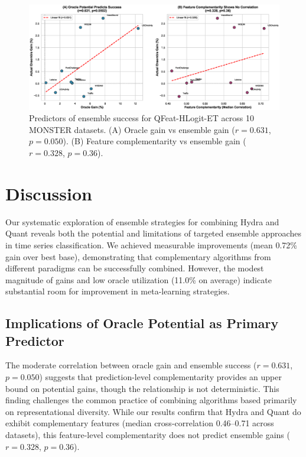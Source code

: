 \documentclass[pdflatex,sn-basic]{sn-jnl}           %
\theoremstyle{thmstyleone}%
\theoremstyle{thmstyletwo}%
\theoremstyle{thmstylethree}%
\begin{document}
\begin{figure}[tb]
\centering
\includegraphics[width=\textwidth]{figure3_predictors}
\caption{Predictors of ensemble success for QFeat-HLogit-ET across 10 MONSTER datasets. (A) Oracle gain vs ensemble gain ($r=0.631$, $p=0.050$). (B) Feature complementarity vs ensemble gain ($r=0.328$, $p=0.36$).}\label{fig:predictors}
\end{figure}


\section{Discussion}\label{sec6}

Our systematic exploration of ensemble strategies for combining Hydra and Quant reveals both the potential and limitations of targeted ensemble approaches in time series classification. We achieved measurable improvements (mean 0.72\% gain over best base), demonstrating that complementary algorithms from different paradigms can be successfully combined. However, the modest magnitude of gains and low oracle utilization (11.0\% on average) indicate substantial room for improvement in meta-learning strategies.

\subsection{Implications of Oracle Potential as Primary Predictor}

The moderate correlation between oracle gain and ensemble success ($r=0.631$, $p=0.050$) suggests that prediction-level complementarity provides an upper bound on potential gains, though the relationship is not deterministic. This finding challenges the common practice of combining algorithms based primarily on representational diversity. While our results confirm that Hydra and Quant do exhibit complementary features (median cross-correlation 0.46--0.71 across datasets), this feature-level complementarity does not predict ensemble gains ($r=0.328$, $p=0.36$).
\end{document}

